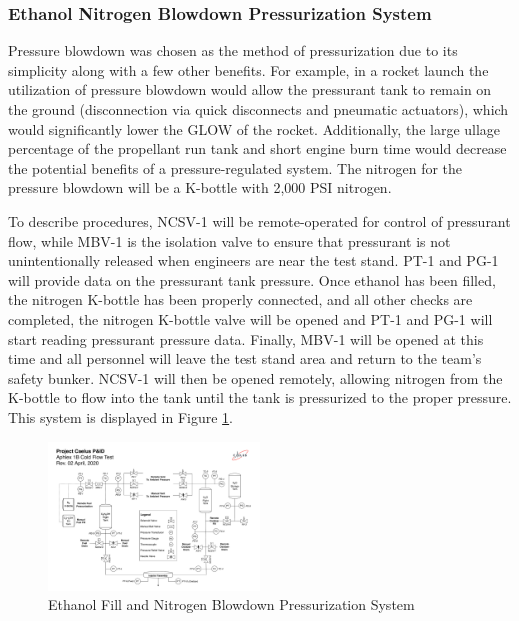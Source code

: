 \documentclass[9pt]{article} %
\numberwithin{equation}{section} %
\begin{document}
\subsubsection{Ethanol Nitrogen Blowdown Pressurization System}
\hspace{\parindent} Pressure blowdown was chosen as the method of pressurization due to its simplicity along with a few other benefits. For example, in a rocket launch the utilization of pressure blowdown would allow the pressurant tank to remain on the ground (disconnection via quick disconnects and pneumatic actuators), which would significantly lower the GLOW of the rocket. Additionally, the large ullage percentage of the propellant run tank and short engine burn time would decrease the potential benefits of a pressure-regulated system. The nitrogen for the pressure blowdown will be a K-bottle with 2,000 PSI nitrogen.

To describe procedures, NCSV-1 will be remote-operated for control of pressurant flow, while MBV-1 is the isolation valve to ensure that pressurant is not unintentionally released when engineers are near the test stand. PT-1 and PG-1 will provide data on the pressurant tank pressure. Once ethanol has been filled, the nitrogen K-bottle has been properly connected, and all other checks are completed, the nitrogen K-bottle valve will be opened and PT-1 and PG-1 will start reading pressurant pressure data. Finally, MBV-1 will be opened at this time and all personnel will leave the test stand area and return to the team's safety bunker. NCSV-1 will then be opened remotely, allowing nitrogen from the K-bottle to flow into the tank until the tank is pressurized to the proper pressure. This system is displayed in Figure \ref{fig:ethanol_fill_and_pressurization_system}.

\begin{figure}[!htb] 
    \centering
    \includegraphics[scale=0.5, width=0.5\textwidth, trim={0cm 19cm 34.05cm 5cm}, clip]{Aphlex1B_04-02-2020_P&ID.pdf} %
    \caption{Ethanol Fill and Nitrogen Blowdown Pressurization System}
    \label{fig:ethanol_fill_and_pressurization_system}
\end{figure}
\end{document}
